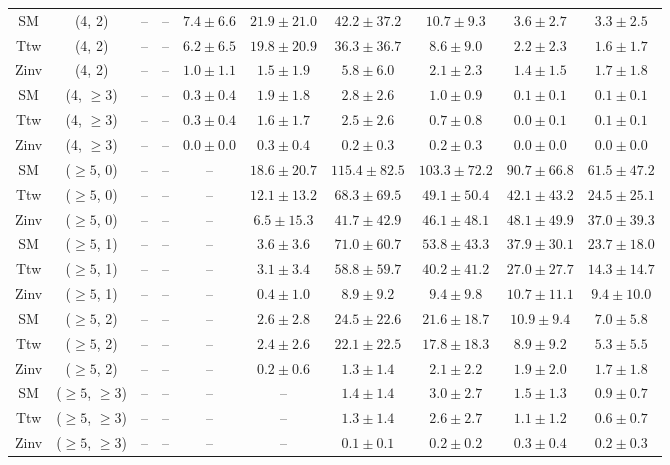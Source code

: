 \begin{table}[h!]
{\begin{tabular}{cccccccccc}
	SM & (4, 2) & -- & -- & $7.4\pm 6.6$ & $21.9\pm 21.0$ & $42.2\pm 37.2$ & $10.7\pm 9.3$ & $3.6\pm 2.7$ & $3.3\pm 2.5$ \\[0.5ex] 
	Ttw & (4, 2) & -- & -- & $6.2\pm 6.5$ & $19.8\pm 20.9$ & $36.3\pm 36.7$ & $8.6\pm 9.0$ & $2.2\pm 2.3$ & $1.6\pm 1.7$ \\[0.5ex] 
	Zinv & (4, 2) & -- & -- & $1.0\pm 1.1$ & $1.5\pm 1.9$ & $5.8\pm 6.0$ & $2.1\pm 2.3$ & $1.4\pm 1.5$ & $1.7\pm 1.8$ \\[0.5ex] 
	SM & (4, $\ge3$) & -- & -- & $0.3\pm 0.4$ & $1.9\pm 1.8$ & $2.8\pm 2.6$ & $1.0\pm 0.9$ & $0.1\pm 0.1$ & $0.1\pm 0.1$ \\[0.5ex] 
	Ttw & (4, $\ge3$) & -- & -- & $0.3\pm 0.4$ & $1.6\pm 1.7$ & $2.5\pm 2.6$ & $0.7\pm 0.8$ & $0.0\pm 0.1$ & $0.1\pm 0.1$ \\[0.5ex] 
	Zinv & (4, $\ge3$) & -- & -- & $0.0\pm 0.0$ & $0.3\pm 0.4$ & $0.2\pm 0.3$ & $0.2\pm 0.3$ & $0.0\pm 0.0$ & $0.0\pm 0.0$ \\[0.5ex] 
	SM & ($\ge5$, 0) & -- & -- & -- & $18.6\pm 20.7$ & $115.4\pm 82.5$ & $103.3\pm 72.2$ & $90.7\pm 66.8$ & $61.5\pm 47.2$ \\[0.5ex] 
	Ttw & ($\ge5$, 0) & -- & -- & -- & $12.1\pm 13.2$ & $68.3\pm 69.5$ & $49.1\pm 50.4$ & $42.1\pm 43.2$ & $24.5\pm 25.1$ \\[0.5ex] 
	Zinv & ($\ge5$, 0) & -- & -- & -- & $6.5\pm 15.3$ & $41.7\pm 42.9$ & $46.1\pm 48.1$ & $48.1\pm 49.9$ & $37.0\pm 39.3$ \\[0.5ex] 
	SM & ($\ge5$, 1) & -- & -- & -- & $3.6\pm 3.6$ & $71.0\pm 60.7$ & $53.8\pm 43.3$ & $37.9\pm 30.1$ & $23.7\pm 18.0$ \\[0.5ex] 
	Ttw & ($\ge5$, 1) & -- & -- & -- & $3.1\pm 3.4$ & $58.8\pm 59.7$ & $40.2\pm 41.2$ & $27.0\pm 27.7$ & $14.3\pm 14.7$ \\[0.5ex] 
	Zinv & ($\ge5$, 1) & -- & -- & -- & $0.4\pm 1.0$ & $8.9\pm 9.2$ & $9.4\pm 9.8$ & $10.7\pm 11.1$ & $9.4\pm 10.0$ \\[0.5ex] 
	SM & ($\ge5$, 2) & -- & -- & -- & $2.6\pm 2.8$ & $24.5\pm 22.6$ & $21.6\pm 18.7$ & $10.9\pm 9.4$ & $7.0\pm 5.8$ \\[0.5ex] 
	Ttw & ($\ge5$, 2) & -- & -- & -- & $2.4\pm 2.6$ & $22.1\pm 22.5$ & $17.8\pm 18.3$ & $8.9\pm 9.2$ & $5.3\pm 5.5$ \\[0.5ex] 
	Zinv & ($\ge5$, 2) & -- & -- & -- & $0.2\pm 0.6$ & $1.3\pm 1.4$ & $2.1\pm 2.2$ & $1.9\pm 2.0$ & $1.7\pm 1.8$ \\[0.5ex] 
	SM & ($\ge5$, $\ge3$) & -- & -- & -- & -- & $1.4\pm 1.4$ & $3.0\pm 2.7$ & $1.5\pm 1.3$ & $0.9\pm 0.7$ \\[0.5ex] 
	Ttw & ($\ge5$, $\ge3$) & -- & -- & -- & -- & $1.3\pm 1.4$ & $2.6\pm 2.7$ & $1.1\pm 1.2$ & $0.6\pm 0.7$ \\[0.5ex] 
	Zinv & ($\ge5$, $\ge3$) & -- & -- & -- & -- & $0.1\pm 0.1$ & $0.2\pm 0.2$ & $0.3\pm 0.4$ & $0.2\pm 0.3$ \\[0.5ex] 
	\hline
	\hline
\end{tabular}}
\end{table}
